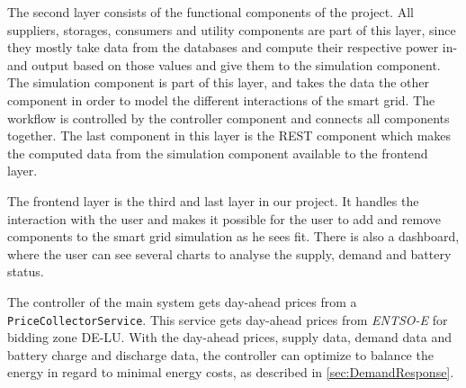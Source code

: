 The second layer consists of the functional components of the project.
All suppliers, storages, consumers and utility components are part of this layer, since they mostly take data from the databases and compute their respective power in- and output based on those values and give them to the simulation component.
The simulation component is part of this layer, and takes the data the other component in order to model the different interactions of the smart grid.
The workflow is controlled by the controller component and connects all components together.
The last component in this layer is the REST component which makes the computed data from the simulation component available to the frontend layer.

The frontend layer is the third and last layer in our project.
It handles the interaction with the user and makes it possible for the user to add and remove components to the smart grid simulation as he sees fit.
There is also a dashboard, where the user can see several charts to analyse the supply, demand and battery status.

The controller of the main system gets day-ahead prices from a \texttt{PriceCollectorService}.
This service gets day-ahead prices from \textit{ENTSO-E} for bidding zone DE-LU.
With the day-ahead prices, supply data, demand data and battery charge and discharge data, the controller can optimize to balance the energy in regard to minimal energy costs, as described in \cref{sec:DemandResponse}.